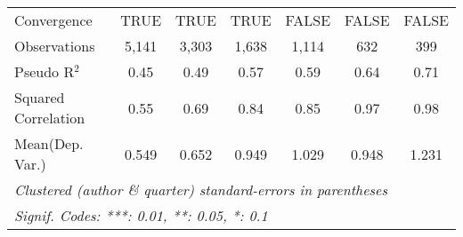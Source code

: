 \begin{tabular}{lcccccc}
   Convergence                                                &TRUE     & TRUE    & TRUE         & FALSE   & FALSE         & FALSE\\  
   Observations                                               & 5,141   & 3,303   & 1,638        & 1,114   & 632           & 399\\  
   Pseudo R$^2$                                               & 0.45    & 0.49    & 0.57         & 0.59    & 0.64          & 0.71\\  
   Squared Correlation                                        & 0.55    & 0.69    & 0.84         & 0.85    & 0.97          & 0.98\\  
Mean(Dep. Var.) & 0.549 & 0.652 & 0.949 & 1.029 & 0.948 & 1.231 \\
   \midrule \midrule
   \multicolumn{7}{l}{\emph{Clustered (author \& quarter) standard-errors in parentheses}}\\
   \multicolumn{7}{l}{\emph{Signif. Codes: ***: 0.01, **: 0.05, *: 0.1}}\\
\end{tabular}
\par\endgroup
